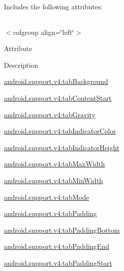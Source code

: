 Includes the following attributes\+:

\tabulinesep=1mm
\begin{longtabu} spread 0pt [c]{*{0}{|X[-1]}|}
\hline
\end{longtabu}
$<$colgroup align=\char`\"{}left\char`\"{}$>$ 

Attribute

Description 

{\ttfamily \hyperlink{classandroid_1_1support_1_1v4_1_1R_1_1styleable_aff73f001a86e4c7bd3a0406f04e2e608}{android.\+support.\+v4\+:tab\+Background}}

{\ttfamily \hyperlink{classandroid_1_1support_1_1v4_1_1R_1_1styleable_a423403a307833c0f1479f98d660ca905}{android.\+support.\+v4\+:tab\+Content\+Start}}

{\ttfamily \hyperlink{classandroid_1_1support_1_1v4_1_1R_1_1styleable_acebed0639553b18aced9e7b66e38ac1d}{android.\+support.\+v4\+:tab\+Gravity}}

{\ttfamily \hyperlink{classandroid_1_1support_1_1v4_1_1R_1_1styleable_ad73a1a29a20855a3bcc60d9bb7acd7b6}{android.\+support.\+v4\+:tab\+Indicator\+Color}}

{\ttfamily \hyperlink{classandroid_1_1support_1_1v4_1_1R_1_1styleable_a11f9245f1247673750bf79b31c3e1832}{android.\+support.\+v4\+:tab\+Indicator\+Height}}

{\ttfamily \hyperlink{classandroid_1_1support_1_1v4_1_1R_1_1styleable_af92579e4d7a148e6a6da15e69617009b}{android.\+support.\+v4\+:tab\+Max\+Width}}

{\ttfamily \hyperlink{classandroid_1_1support_1_1v4_1_1R_1_1styleable_aea0e67b08f61fea507155aa4237dcd59}{android.\+support.\+v4\+:tab\+Min\+Width}}

{\ttfamily \hyperlink{classandroid_1_1support_1_1v4_1_1R_1_1styleable_a7c5dda59a3cd0a09b99263ba97c5f0d0}{android.\+support.\+v4\+:tab\+Mode}}

{\ttfamily \hyperlink{classandroid_1_1support_1_1v4_1_1R_1_1styleable_ad20356f6d901f463b8d5baf3875311a0}{android.\+support.\+v4\+:tab\+Padding}}

{\ttfamily \hyperlink{classandroid_1_1support_1_1v4_1_1R_1_1styleable_a9cf94d20ae7b1d2855d68fb86f6d2af0}{android.\+support.\+v4\+:tab\+Padding\+Bottom}}

{\ttfamily \hyperlink{classandroid_1_1support_1_1v4_1_1R_1_1styleable_a89b79e5b865d6a39d504534559653673}{android.\+support.\+v4\+:tab\+Padding\+End}}

{\ttfamily \hyperlink{classandroid_1_1support_1_1v4_1_1R_1_1styleable_af995762d21ce21572c50a4d2905ccc22}{android.\+support.\+v4\+:tab\+Padding\+Start}}

